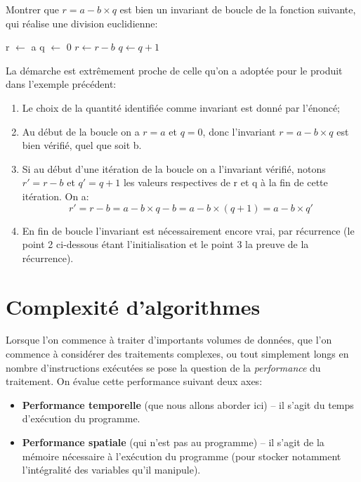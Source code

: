 \documentclass[12pt]{article}
\begin{document}
	\begin{MonExo}
		Montrer que $r = a - b \times q$ est bien un invariant de boucle de la fonction suivante, qui réalise une division euclidienne:
		\begin{algorithmic}[1]
			\State r $\leftarrow$ a
			\State q $\leftarrow$ 0
			\State $r \leftarrow r - b$
			\State $q \leftarrow q + 1$
			\EndWhile
			\State{}
			\EndFunction
		\end{algorithmic}
	\end{MonExo}
	
	\begin{MaReponse}
		La démarche est extrêmement proche de celle qu'on a adoptée pour le produit dans l'exemple précédent:
		\begin{enumerate}
			\item Le choix de la quantité identifiée comme invariant est donné par l'énoncé;
			\item Au début de la boucle on a $r = a$ et $q = 0$, donc l'invariant $r = a - b \times q$ est bien vérifié, quel que soit b.
			\item Si au début d'une itération de la boucle on a l'invariant vérifié, notons $r' = r - b$ et $q' = q + 1$ les valeurs respectives de r et q à la fin de cette itération. On a:
			\[ r' = r - b = a - b \times q - b = a - b \times (q + 1) = a - b \times q'\]
			\item En fin de boucle l'invariant est nécessairement encore vrai, par récurrence (le point 2 ci-dessous étant l'initialisation et le point 3 la preuve de la récurrence).
		\end{enumerate}
	\end{MaReponse}
	
	\pagebreak
	\section{Complexité d'algorithmes}
	Lorsque l'on commence à traiter d'importants volumes de données, que l'on commence à considérer des traitements complexes, ou tout simplement longs en nombre d'instructions exécutées se pose la question de la \textit{performance} du traitement. On évalue cette performance suivant deux axes:
	\begin{itemize}
		\item \textbf{Performance temporelle} (que nous allons aborder ici) -- il s'agit du temps d'exécution du programme.
		\item \textbf{Performance spatiale }(qui n'est pas au programme) -- il s'agit de la mémoire nécessaire à l'exécution du programme (pour stocker notamment l'intégralité des variables qu'il manipule).
	\end{itemize}
	
\end{document}

